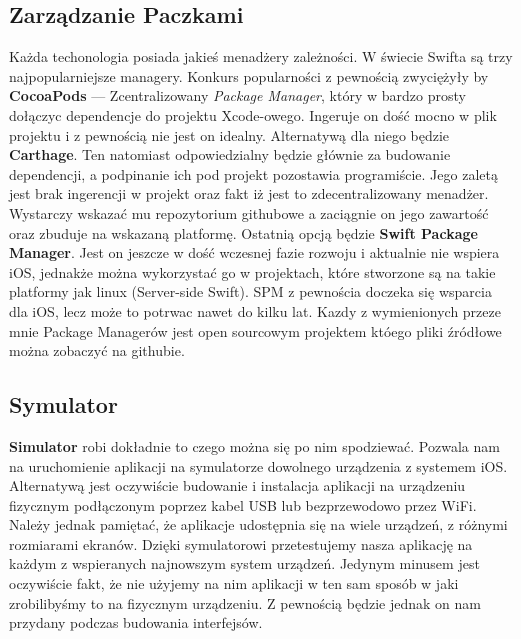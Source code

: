 \documentclass{article}
\begin{document}
\subsection*{Zarządzanie Paczkami}
Każda techonologia posiada jakieś menadżery zależności. W świecie Swifta są trzy
najpopularniejsze managery. Konkurs popularności z pewnością zwyciężyły by 
\textbf{CocoaPods} --- Zcentralizowany \textit{Package Manager}, który w bardzo 
prosty dołączyc dependencje do projektu Xcode-owego. Ingeruje on dość mocno w 
plik projektu i z pewnością nie jest on idealny. Alternatywą dla niego będzie
\textbf{Carthage}. Ten natomiast odpowiedzialny będzie głównie za budowanie dependencji,
a podpinanie ich pod projekt pozostawia programiście. Jego zaletą jest brak 
ingerencji w projekt oraz fakt iż jest to zdecentralizowany menadżer. Wystarczy
wskazać mu repozytorium githubowe a zaciągnie on jego zawartość oraz zbuduje
na wskazaną platformę. Ostatnią opcją będzie \textbf{Swift Package Manager}. Jest 
on jeszcze w dość wczesnej fazie rozwoju i aktualnie nie wspiera iOS, jednakże
można wykorzystać go w projektach, które stworzone są na takie platformy jak linux
(Server-side Swift). SPM z pewnościa doczeka się wsparcia dla iOS, lecz może to 
potrwac nawet do kilku lat. Kazdy z wymienionych przeze mnie Package Managerów 
jest open sourcowym projektem któego pliki źródłowe można zobaczyć na githubie.

\subsection*{Symulator}
\textbf{Simulator} robi dokładnie to czego można się po nim spodziewać. Pozwala
nam na uruchomienie aplikacji na symulatorze dowolnego urządzenia z systemem iOS\@.
Alternatywą jest oczywiście budowanie i instalacja aplikacji na urządzeniu fizycznym 
podłączonym poprzez kabel USB lub bezprzewodowo przez WiFi. Należy jednak pamiętać,
że aplikacje udostępnia się na wiele urządzeń, z różnymi rozmiarami ekranów. 
Dzięki symulatorowi przetestujemy nasza aplikację na każdym z wspieranych najnowszym
system urządzeń. Jedynym minusem jest oczywiście fakt, że nie użyjemy na nim aplikacji
w ten sam sposób w jaki zrobilibyśmy to na fizycznym urządzeniu. Z pewnością będzie
jednak on nam przydany podczas budowania interfejsów.
\end{document}
